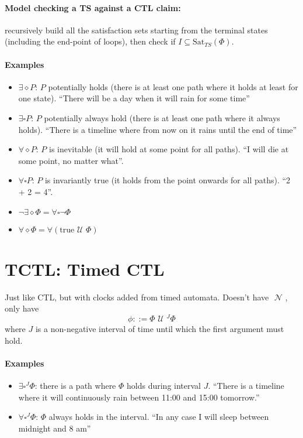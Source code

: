 \documentclass{article}
\newcommand{\U}{\,\,\mathcal{U}\,\,}
\newcommand{\N}{\,\,\mathcal{N}\,\,}
\begin{document}
\paragraph{Model checking a TS against a CTL claim:} recursively build all the
satisfaction sets starting from the terminal states (including the end-point of
loops), then check if $I \subseteq \text{Sat}_{TS}(\Phi)$.
\paragraph{Examples}
\begin{itemize}
\item $\exists\diamond P$: $P$ potentially holds (there is at least one path
  where it holds at least for one state). ``There will be a day when it will
  rain for some time''
\item $\exists\square P$: $P$ potentially always hold (there is at least one
  path where it always holds). ``There is a timeline where from now on it rains
  until the end of time''
\item $\forall\diamond P$: $P$ is inevitable (it will hold at some point for all
  paths). ``I will die at some point, no matter what''.
\item $\forall\square P$: $P$ is invariantly true (it holds from the point
  onwards for all paths). ``2 + 2 = 4''.
\item $\neg \exists \diamond \Phi = \forall \square \neg \Phi$
\item $\forall\diamond \Phi = \forall (\text{true} \U \Phi)$
\end{itemize}

\section{TCTL: Timed CTL}
Just like CTL, but with clocks added from timed automata.
Doesn't have $\N$, only have
\[
  \phi ::= \Phi \U^J \Phi
\]
where $J$ is a non-negative interval of time until which the first argument must hold.
\paragraph{Examples}
\begin{itemize}
\item $\exists\square^J \Phi$: there is a path where $\Phi$ holds during
  interval $J$. ``There is a timeline where it will continuously rain between 11:00 and 15:00
  tomorrow.''
\item $\forall\square^J \Phi$: $\Phi$ always holds in the interval. ``In any
  case I will sleep between midnight and 8 am''
\end{itemize}
\end{document}
